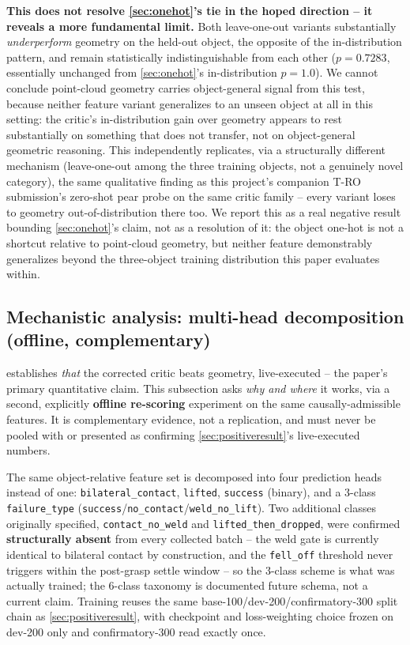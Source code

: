 \documentclass[journal]{IEEEtran}
\begin{document}
\textbf{This does not resolve \cref{sec:onehot}'s tie in the hoped
direction -- it reveals a more fundamental limit.} Both leave-one-out
variants substantially \emph{underperform} geometry on the held-out
object, the opposite of the in-distribution pattern, and remain
statistically indistinguishable from each other ($p{=}0.7283$, essentially
unchanged from \cref{sec:onehot}'s in-distribution $p{=}1.0$). We cannot
conclude point-cloud geometry carries object-general signal from this
test, because neither feature variant generalizes to an unseen object at
all in this setting: the critic's in-distribution gain over geometry
appears to rest substantially on something that does not transfer, not
on object-general geometric reasoning. This independently replicates,
via a structurally different mechanism (leave-one-out among the three
training objects, not a genuinely novel category), the same qualitative
finding as this project's companion T-RO submission's zero-shot pear
probe on the same critic family -- every variant loses to geometry
out-of-distribution there too. We report this as a real negative result
bounding \cref{sec:onehot}'s claim, not as a resolution of it: the object
one-hot is not a shortcut relative to point-cloud geometry, but neither
feature demonstrably generalizes beyond the three-object training
distribution this paper evaluates within.

\subsection{Mechanistic analysis: multi-head decomposition (offline,
complementary)}
\label{sec:mechanistic}

 establishes \emph{that} the corrected critic
beats geometry, live-executed -- the paper's primary quantitative claim.
This subsection asks \emph{why and where} it works, via a second,
explicitly \textbf{offline re-scoring} experiment on the same
causally-admissible features. It is complementary evidence, not a
replication, and must never be pooled with or presented as confirming
\cref{sec:positiveresult}'s live-executed numbers.

The same object-relative feature set is decomposed into four prediction
heads instead of one: \texttt{bilateral\_contact}, \texttt{lifted},
\texttt{success} (binary), and a 3-class \texttt{failure\_type}
(\texttt{success}/\texttt{no\_contact}/\texttt{weld\_no\_lift}). Two
additional classes originally specified, \texttt{contact\_no\_weld} and
\texttt{lifted\_then\_dropped}, were confirmed \textbf{structurally
absent} from every collected batch -- the weld gate is currently identical
to bilateral contact by construction, and the \texttt{fell\_off} threshold
never triggers within the post-grasp settle window -- so the 3-class
scheme is what was actually trained; the 6-class taxonomy is documented
future schema, not a current claim. Training reuses the same
base-100/dev-200/confirmatory-300 split chain as \cref{sec:positiveresult},
with checkpoint and loss-weighting choice frozen on dev-200 only and
confirmatory-300 read exactly once.
\end{document}
